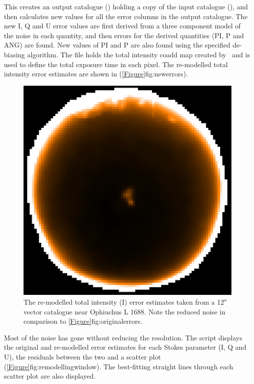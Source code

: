 \begin{terminalv}
\end{terminalv}


This  creates an output catalogue () holding a copy of the input catalogue (), and then calculates new values for all the error columns in the output catalogue. The new I, Q and U error values are first derived from a three component model of the noise in each quantity, and then errors for the derived quantities (PI, P and ANG) are found. New values of PI and P are also found using the specified de-biasing algorithm. The file  holds the total intensity coadd map created by \poltwomap\ and is used to define the total exposure time in each pixel. The re-modelled total intensity error estimates are shown in (\cref{Figure}{fig:newerrors}{}).

\begin{figure}[ht!]
\begin{center}
\includegraphics[width=0.46\linewidth]{sc22-ophl1688-pol2-noise-remod-1.png}
\caption [Remodelled Error Estimates in POL-2 Vector Catalogue for Oph L1688]{
  The re-modelled total intensity (I) error estimates taken from a 12\si{\arcsecond} vector catalogue near Ophiuchus L 1688. Note the reduced noise in comparison to \cref{Figure}{fig:originalerrors}{}.
\label{fig:newerrors}
}
\end{center}
\end{figure}

Most of the noise has gone without reducing the resolution. The script displays the original and re-modelled error estimates for each Stokes parameter (I, Q and U), the residuals between the two and a scatter plot (\cref{Figure}{fig:remodellingwindow}{}). The best-fitting straight lines through each scatter plot are also displayed.

